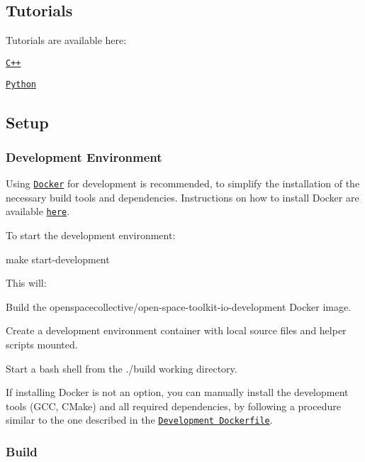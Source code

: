 \subsection*{Tutorials}

Tutorials are available here\+:


\begin{DoxyItemize}
\item \href{./tutorials/cpp}{\tt C++}
\item \href{./tutorials/python}{\tt Python}
\end{DoxyItemize}

\subsection*{Setup}

\subsubsection*{Development Environment}

Using \href{https://www.docker.com}{\tt Docker} for development is recommended, to simplify the installation of the necessary build tools and dependencies. Instructions on how to install Docker are available \href{https://docs.docker.com/install/}{\tt here}.

To start the development environment\+:


\begin{DoxyCode}
make start-development
\end{DoxyCode}


This will\+:


\begin{DoxyEnumerate}
\item Build the {\ttfamily openspacecollective/open-\/space-\/toolkit-\/io-\/development} Docker image.
\item Create a development environment container with local source files and helper scripts mounted.
\item Start a {\ttfamily bash} shell from the {\ttfamily ./build} working directory.
\end{DoxyEnumerate}

If installing Docker is not an option, you can manually install the development tools (G\+CC, C\+Make) and all required dependencies, by following a procedure similar to the one described in the \href{./docker/development/Dockerfile}{\tt Development Dockerfile}.

\subsubsection*{Build}

